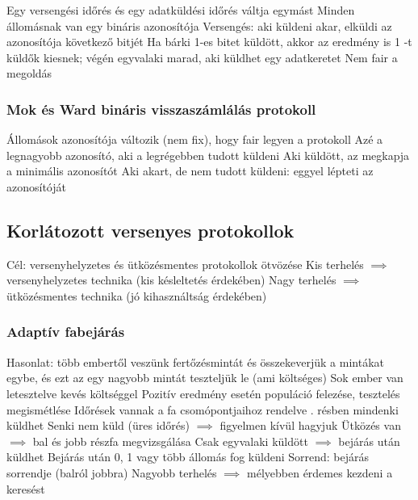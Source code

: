 \documentclass[12pt,a4paper]{article}
\begin{document}
\begin{outline}
	\1 Egy versengési időrés és egy adatküldési időrés váltja egymást
	\1 Minden állomásnak van egy bináris azonosítója
	\1 Versengés: aki küldeni akar, elküldi az azonosítója következő bitjét
		\2 Ha bárki 1-es bitet küldött, akkor az eredmény is 1
		-t küldők kiesnek; végén egyvalaki marad, aki küldhet egy adatkeretet
	\1 Nem fair a megoldás
\end{outline}

\subsubsection{Mok és Ward bináris visszaszámlálás protokoll}

\begin{outline}
	\1 Állomások azonosítója változik (nem fix), hogy fair legyen a protokoll
	\1 Azé a legnagyobb azonosító, aki a legrégebben tudott küldeni
	\1 Aki küldött, az megkapja a minimális azonosítót
	\1 Aki akart, de nem tudott küldeni: eggyel lépteti az azonosítóját
\end{outline}

\pagebreak

\subsection{Korlátozott versenyes protokollok}

\begin{outline}
	\1 Cél: versenyhelyzetes és ütközésmentes protokollok ötvözése
	\1 Kis terhelés $\implies$ versenyhelyzetes technika (kis késleltetés érdekében)
	\1 Nagy terhelés $\implies$ ütközésmentes technika (jó kihasználtság érdekében)
\end{outline}

\subsubsection{Adaptív fabejárás}

\begin{outline}
	\1 Hasonlat: több embertől veszünk fertőzésmintát és összekeverjük a mintákat egybe, és ezt az egy nagyobb mintát teszteljük le (ami költséges)
		\2 Sok ember van letesztelve kevés költséggel
		\2 Pozitív eredmény esetén populáció felezése, tesztelés megismétlése
	\1 Időrések vannak a fa csomópontjaihoz rendelve
		. résben mindenki küldhet
		\2 Senki nem küld (üres időrés) $\implies$ figyelmen kívül hagyjuk
		\2 Ütközés van $\implies$ bal és jobb részfa megvizsgálása
		\2 Csak egyvalaki küldött $\implies$ bejárás után küldhet
	\1 Bejárás után 0, 1 vagy több állomás fog küldeni
		\2 Sorrend: bejárás sorrendje (balról jobbra)
	\1 Nagyobb terhelés $\implies$ mélyebben érdemes kezdeni a keresést	
\end{outline}
\end{document}
